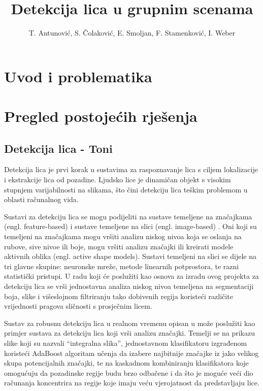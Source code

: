 \documentclass[times, utf8, seminar, numeric]{fer}
\title{Detekcija lica u grupnim scenama}
\author{T. Antunović, S. Čolaković, E. Smoljan, F. Stamenković, I. Weber}
\begin{document}
\maketitle

\tableofcontents

\chapter{Uvod i problematika}

\chapter{Pregled postojećih rješenja}

\section{Detekcija lica - Toni}

Detekcija lica je prvi korak u sustavima za raspoznavanje lica s ciljem lokalizacije i ekstrakcije lica od pozadine. Ljudsko lice je dinamičan objekt s visokim stupnjem varijabilnosti na slikama, što čini detekciju lica teškim problemom u oblasti računalnog vida.

Sustavi za detekciju lica se mogu podijeliti na sustave temeljene na značajkama (engl. feature-based) i sustave temeljene na slici (engl. image-based) \cite{CVIU2001:Hjelmas}. Oni koji su temeljeni na značajkama mogu vršiti analizu niskog nivoa koja se oslanja na rubove, sive nivoe ili boje, mogu vršiti analizu značajki ili kreirati modele aktivnih oblika (engl. active shape models). Sustavi temeljeni na slici se dijele na tri glavne skupine: neuronske mreže, metode linearnih potprostora, te razni statistički pristupi. U radu koji će poslužiti kao osnova za izradu ovog projekta \cite{conf/isda/ChandrappaR12} za detekciju lica se vrši jednostavna analiza niskog nivoa temeljena na segmentaciji boja, slike i višeslojnom filtriranju tako dobivenih regija koristeći različite vrijednosti pragova sličnosti s prosječnim licem.

Sustav za robusnu detekciju lica u realnom vremenu opisan u \cite{Viola04robustreal-time} može poslužiti kao primjer sustava za detekciju lica koji vrši analizu značajki. Temelji se na prikazu slike koji su nazvali “integralna slika”, jednostavnom klasifikatoru izgrađenom koristeći AdaBoost algoritam učenja da izabere najbitnije značajke iz jako velikog skupa potencijalnih značajki, te na kaskadnom kombiniranju klasifikatora koje omogućuju da pozadinske regije budu brzo odbačene i da što je moguće veći dio računanja koncentrira na regije koje imaju veću vjerojatnost da predstavljaju lice.
\end{document}
